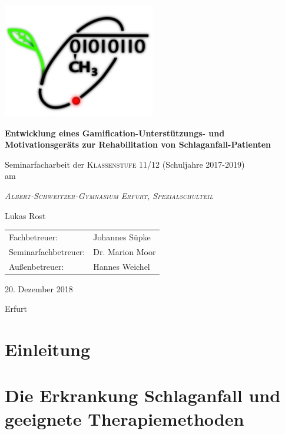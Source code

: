 \documentclass[a4paper, 11pt, titlepage, bibliography=totocnumbered]{scrartcl}
\begin{document}
\begin{titlepage}
	\centering
	\includegraphics[width=0.5\textwidth]{pics/logo}\par\vspace{1cm}
	{\huge\bfseries Entwicklung eines Gamification-Unterstützungs- und Motivationsgeräts zur Rehabilitation von Schlaganfall-Patienten\par}
	\vspace{2cm}
	{\large Seminarfacharbeit der \textsc{Klassenstufe 11/12} (Schuljahre 2017-2019)\\ am \\}
		{\scshape\Large\itshape Albert-Schweitzer-Gymnasium Erfurt, Spezialschulteil \par}
	\vspace{2cm}
	{\Large Lukas Rost}
	\vfill
	{\begin{tabular}{ll}
	\Large Fachbetreuer: & \Large Johannes Süpke \\[5pt]
	\Large Seminarfachbetreuer: & \Large Dr. Marion Moor \\[5pt]
	\Large Außenbetreuer: & \Large Hannes Weichel \\
	\end{tabular}}
	\vfill
	{\Large 20. Dezember 2018\par Erfurt}
\end{titlepage}

\newpage

\tableofcontents
\setcounter{page}{1}
\newpage

\section{Einleitung}


\newpage
\section{Die Erkrankung Schlaganfall und geeignete Therapiemethoden}

\end{document}
